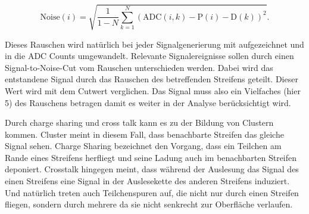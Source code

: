 \begin{equation}
  \mathup{Noise}(i) = \sqrt{ \frac{1}{1 - N}  \sum^N_{k = 1} ( \mathup{ADC}(i,k) - \mathup{P}(i) - \mathup{D}(k))^2  }.
\end{equation}

Dieses Rauschen wird natürlich bei jeder Signalgenerierung mit aufgezeichnet und in die ADC Counts umgewandelt.
Relevante Signalereignisse sollen durch einen Signal-to-Noise-Cut vom Rauschen unterschieden werden.
Dabei wird das entstandene Signal durch das Rauschen des betreffenden Streifens geteilt.
Dieser Wert wird mit dem Cutwert verglichen.
Das Signal muss also ein Vielfaches (hier 5) des Rauschens betragen damit es weiter in der Analyse berücksichtigt wird.

Durch charge sharing und cross talk kann es zu der Bildung von Clustern kommen.
Cluster meint in diesem Fall, dass benachbarte Streifen das gleiche Signal sehen.
Charge Sharing bezeichnet den Vorgang, dass ein Teilchen am Rande eines Streifens herfliegt und seine Ladung auch im benachbarten Streifen deponiert.
Crosstalk hingegen meint, dass während der Auslesung das Signal des einen Streifens eine Signal in der Auslesekette des anderen Streifens induziert.
Und natürlich treten auch Teilchenspuren auf, die nicht nur durch einen Streifen fliegen, sondern durch mehrere da sie nicht senkrecht zur Oberfläche verlaufen.


















%

